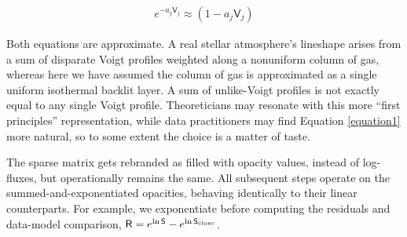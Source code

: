 \documentclass[modern]{aastex631}
\begin{document}
\begin{eqnarray}
    e^{-a_j \mathsf{V}_j} \approx (1-a_j\mathsf{V}_j) \label{eqnTaylor}
\end{eqnarray}

Both equations are approximate. A real stellar atmosphere's lineshape arises from a sum of disparate Voigt profiles weighted along a nonuniform column of gas, whereas here we have assumed the column of gas is approximated as a single uniform isothermal backlit layer.  A sum of unlike-Voigt profiles is not exactly equal to any single Voigt profile.  Theoreticians may resonate with this more ``first principles'' representation, while data practitioners may find Equation \ref{equation1} more natural, so to some extent the choice is a matter of taste.

The sparse matrix gets rebranded as filled with opacity values, instead of log-fluxes, but operationally remains the same. All subsequent steps operate on the summed-and-exponentiated opacities, behaving identically to their linear counterparts.  For example, we exponentiate before computing the residuals and data-model comparison, $\mathsf{R} = e^{\ln{\mathsf{S}}} - e^{\ln{\mathsf{S}_{\rm clone}}}$.
\end{document}

